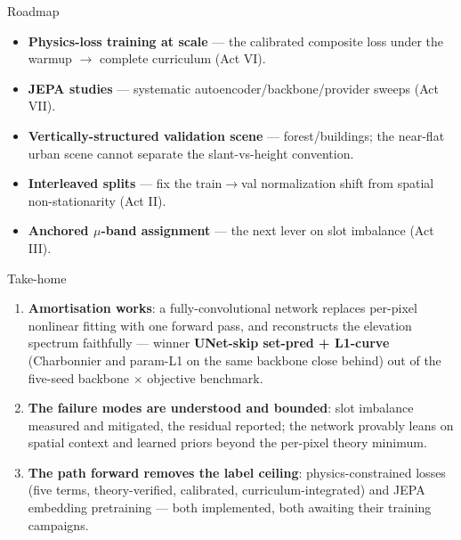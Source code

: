 \begin{frame}{Roadmap}
  \small
  \begin{itemize}
    \item \textbf{Physics-loss training at scale} --- the calibrated composite loss under
          the warmup $\to$ complete curriculum (Act VI).
    \item \textbf{JEPA studies} --- systematic autoencoder/backbone/provider sweeps
          (Act VII).
    \item \textbf{Vertically-structured validation scene} --- forest/buildings; the
          near-flat urban scene cannot separate the slant-vs-height convention.
    \item \textbf{Interleaved splits} --- fix the train$\to$val normalization shift from
          spatial non-stationarity (Act II).
    \item \textbf{Anchored $\mu$-band assignment} --- the next lever on slot imbalance
          (Act III).
  \end{itemize}
\end{frame}

\begin{frame}{Take-home}
  \small
  \begin{enumerate}
    \item \textbf{Amortisation works}: a fully-convolutional network replaces per-pixel
          nonlinear fitting with one forward pass, and reconstructs the elevation
          spectrum faithfully --- winner \textbf{UNet-skip set-pred + L1-curve}
          (Charbonnier and param-L1 on the same backbone close behind) out of the
          five-seed backbone $\times$ objective benchmark.
    \item \textbf{The failure modes are understood and bounded}: slot imbalance measured
          and mitigated, the residual reported; the network provably leans on spatial context
          and learned priors beyond the per-pixel theory minimum.
    \item \textbf{The path forward removes the label ceiling}: physics-constrained losses
          (five terms, theory-verified, calibrated, curriculum-integrated) and JEPA
          embedding pretraining --- both implemented, both awaiting their training
          campaigns.
  \end{enumerate}
\end{frame}
